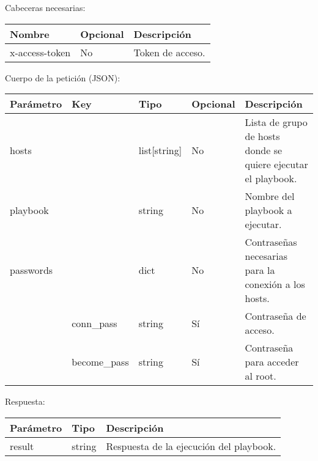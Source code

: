 		Cabeceras necesarias:
		\begin{table}[h!]
			\centering
	\begin{adjustbox}{max width=\textwidth}
			\begin{tabular}{|l|l|l|}
				\hline
				Nombre & Opcional & Descripción \\ \hline
				x-access-token & No & Token de acceso. \\ \hline
			\end{tabular}
\end{adjustbox}
		\end{table}
		
		Cuerpo de la petición (JSON):
		\begin{table}[h!]
			\centering
	\begin{adjustbox}{max width=\textwidth}
			\begin{tabular}{|l|l|l|l|l|}
				\hline
				Parámetro & Key & Tipo & Opcional & Descripción \\ \hline
				hosts &  & list[string] & No & Lista de grupo de hosts donde se quiere ejecutar el playbook. \\ \hline
				playbook &  & string & No & Nombre del playbook a ejecutar. \\ \hline
				passwords &  & dict & No & Contraseñas necesarias para la conexión a los hosts. \\ \hline
				& conn\_pass & string & Sí & Contraseña de acceso. \\ \hline
				& become\_pass & string & Sí & Contraseña para acceder al root. \\ \hline
			\end{tabular}
\end{adjustbox}
		\end{table}
		
		Respuesta:
		\begin{table}[h!]
			\centering
	\begin{adjustbox}{max width=\textwidth}
			\begin{tabular}{|l|l|l|}
				\hline
				Parámetro & Tipo & Descripción \\ \hline
				result & string & Respuesta de la ejecución del playbook. \\ \hline
			\end{tabular}
\end{adjustbox}
		\end{table}







